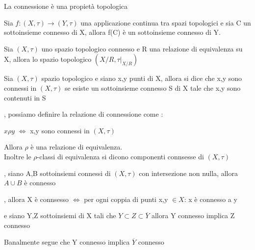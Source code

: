 \documentclass[a4paper]{article}
\begin{document}
\begin{oss}
	La connessione è una propietà topologica
\end{oss}

\begin{prop}
	Sia $f : (X , \tau) \to (Y,\tau) $ una applicazione continua tra spazi topologici e sia C un sottoinsieme connesso di X, allora f(C) è un sottoinsieme connesso di Y.
\end{prop}

\begin{oss}
	Sia $ (X,\tau) $ uno spazio topologico connesso e R una relazione di equivalenza su X, allora lo spazio topologico $(X/R , \tau |_{X/R})$ 
\end{oss}

\begin{deff}
	Sia $(X, \tau )$ spazio topologico e siano x,y punti di X, allora si dice che x,y sono connessi in $(X,\tau)$ se esiste un sottoinsieme connesso S di X tale che x,y sono contenuti in S
\end{deff}

\begin{lem}
	\xtausptop , possiamo definire la relazione di connessione come : 
	\begin{center}
		$x \rho y $ $\Longleftrightarrow $ x,y sono connessi in $(X,\tau)$
	\end{center}
	Allora $\rho$ è una relazione di equivalenza.\\
	Inoltre le $\rho$-classi di equivalenza si dicono componenti connsesse di $(X,\tau)$ 
\end{lem}

\begin{prop}
	\xtausptop, siano A,B sottoinsiemi connessi di $(X,\tau)$ con intersezione non nulla, allora $A \cup B $ è connesso
\end{prop}

\begin{prop}
	\xtausptop, allora X è connsesso $\Longleftrightarrow$ per ogni coppia di punti x,y $\in X$: x è connesso a y
\end{prop}

\begin{lem}
	\xtausptop e siano Y,Z sottoinsiemi di X tali che $ Y \subset Z \subset \overline{Y}$ allora Y connesso implica Z connesso

\end{lem}

\begin{cor}
	Banalmente segue che Y connesso implica $\overline{Y}$ connesso
\end{cor}
\end{document}

